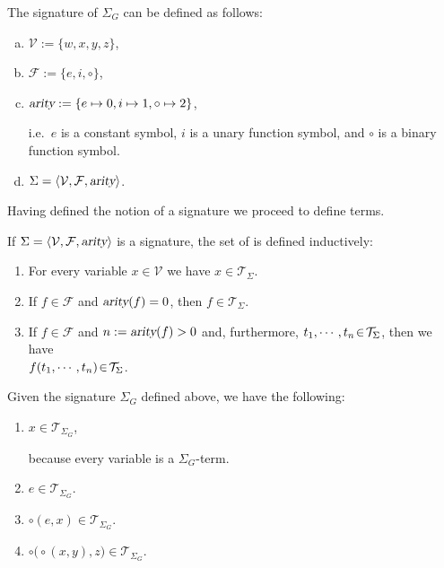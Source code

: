 \example
The signature of  $\Sigma_G$ can be defined as follows:
\begin{enumerate}[(a)]
\item $\mathcal{V} := \{ w, x, y, z \}$,
\item $\mathcal{F} := \{ e, i, \circ \}$,
\item $\textsl{arity} := \{ e \mapsto 0, i \mapsto 1, \circ \mapsto 2 \}$,
  
      i.e.~$e$ is a constant symbol, $i$ is a unary function symbol, and $\circ$ is a binary function symbol.
\item $\Sigma = \langle \mathcal{V}, \mathcal{F}, \textsl{arity} \rangle$. \eoxs
\end{enumerate}

\noindent
Having defined the notion of a signature we proceed to define terms.

\begin{Definition}
  If $\Sigma = \langle \mathcal{V}, \mathcal{F}, \textsl{arity} \rangle$ is a signature, the set of
     
   is defined inductively:
  \begin{enumerate}
  \item For every variable $x \in \mathcal{V}$ we have $x \in \mathcal{T}_\Sigma$.
  \item If $f \in \mathcal{F}$ and $\textsl{arity}(f) = 0$, then $f \in \mathcal{T}_\Sigma$.
  \item If $f \in \mathcal{F}$ and $n := \textsl{arity}(f) > 0$ and, furthermore, $t_1,\cdots,t_n \!\in\! \mathcal{T}_\Sigma$,  then we have
        \\[0.2cm]
        \hspace*{1.3cm} $f(t_1,\cdots,t_n) \!\in\! \mathcal{T}_\Sigma$.
        \eoxs
  \end{enumerate}
\end{Definition}

\example
Given the signature $\Sigma_G$ defined above, we have the following:
\begin{enumerate}
\item $x \in \mathcal{T}_{\Sigma_G}$,
  
      because every variable is a $\Sigma_{G}$-term.
\item $e \in \mathcal{T}_{\Sigma_G}$.
\item $\circ(e,x) \in \mathcal{T}_{\Sigma_G}$.
\item $\circ\bigl(\circ(x,y),z\bigr) \in \mathcal{T}_{\Sigma_G}$.
\end{enumerate}

